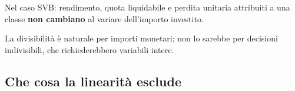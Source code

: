 \begin{frame}
\begin{stepitemize}
\item Nel caso SVB: rendimento, quota liquidabile e perdita unitaria
attribuiti a una classe \textbf{non cambiano} al variare dell'importo investito.

\item La divisibilit\`{a} \`{e} naturale per importi monetari; non lo sarebbe
per decisioni indivisibili, che richiederebbero variabili intere.
\end{stepitemize}

%

\transboxout
\end{frame}%






\subsection{Che cosa la linearit\`{a} esclude}%

